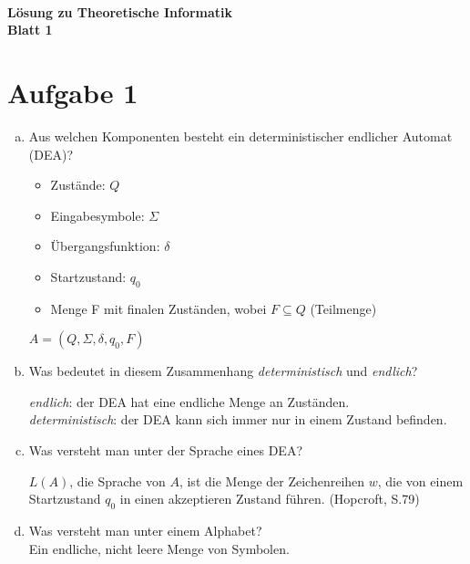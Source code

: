 \documentclass[12pt]{scrartcl}
\begin{document}
~
\medskip 
    \begin{center}
      \textbf{\large{Lösung zu Theoretische Informatik\\Blatt 1}}\\
    \end{center}

\section*{Aufgabe 1}

\begin{enumerate}[a)]
\item Aus welchen Komponenten besteht ein deterministischer endlicher Automat
(DEA)?

\begin{itemize}
\item    Zustände: $Q$
\item    Eingabesymbole: $\Sigma$
\item    Übergangsfunktion: $\delta$
\item    Startzustand: $q_0$
\item    Menge F mit finalen Zuständen, wobei $F \subseteq Q$ (Teilmenge)
\end{itemize}
    $A=(Q,\Sigma,\delta,q_0,F)$\\

\item Was bedeutet in diesem Zusammenhang \textsl{deterministisch} und
\textsl{endlich}?

    \textsl{endlich}: der DEA hat eine endliche Menge an Zuständen.\\
    \textsl{deterministisch}: der DEA kann sich immer nur in einem Zustand befinden.
    
\item Was versteht man unter der Sprache eines DEA?

    $L(A)$, die Sprache von $A$, ist die Menge der Zeichenreihen $w$, die von einem Startzustand $q_0$ in einen akzeptieren Zustand führen. (Hopcroft, S.79)
\item Was versteht man unter einem Alphabet?\\
  Ein endliche, nicht leere Menge von Symbolen.
\end{enumerate}
\end{document}
